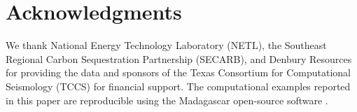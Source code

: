 \section{Acknowledgments}
We thank National Energy Technology Laboratory (NETL), the Southeast Regional Carbon Sequestration Partnership (SECARB), and Denbury Resources
for providing the data and sponsors of the 
Texas Consortium for Computational Seismology (TCCS) for financial support. The computational examples 
reported in this paper are reproducible using the Madagascar open-source 
software \cite[]{fomel13}.




